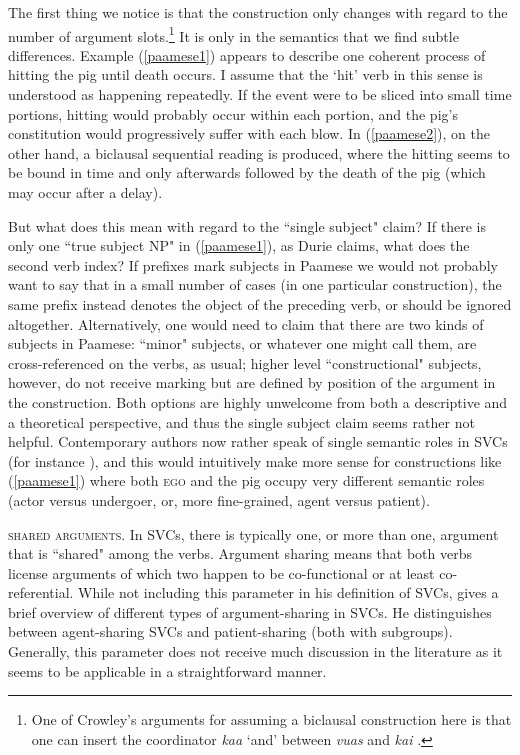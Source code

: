 The first thing we notice is that the construction only changes with regard to the number of argument slots.\footnote{One of Crowley's arguments for assuming a biclausal construction here is that one can insert the coordinator \textit{kaa} `and' between \textit{vuas} and \textit{kai} \citep[56]{crowley2002serial}.} It is only in the semantics that we find subtle differences. Example (\ref{paamese1}) appears to describe one coherent process of hitting the pig until death occurs. I assume that the `hit' verb in this sense is understood as happening repeatedly. If the event were to be sliced into small time portions, hitting would probably occur within each portion, and the pig's constitution would progressively suffer with each blow. In (\ref{paamese2}), on the other hand, a biclausal sequential reading is produced, where the hitting seems to be bound in time and only afterwards followed by the death of the pig (which may occur after a delay). 

But what does this mean with regard to the ``single subject" claim? If there is only one ``true subject NP" in (\ref{paamese1}), as Durie claims, what does the second verb index? If prefixes mark subjects in Paamese we would not probably want to say that in a small number of cases (in one particular construction), the same prefix instead denotes the object of the preceding verb, or should be ignored altogether. Alternatively, one would need to claim that there are two kinds of subjects in Paamese: ``minor" subjects, or whatever one might call them, are cross-referenced on the verbs, as usual; higher level ``constructional" subjects, however, do not receive marking but are defined by position of the argument in the construction. Both options are highly unwelcome from both a descriptive and a theoretical perspective, and thus the single subject claim seems rather not helpful. Contemporary authors now rather speak of single semantic roles in SVCs (for instance \citealt{haspelmath2016serial}), and this would intuitively make more sense for constructions like (\ref{paamese1}) where both \textsc{ego} and the pig occupy very different semantic roles (actor versus undergoer, or, more fine-grained, agent versus patient).

\textsc{shared arguments}. In SVCs, there is typically one, or more than one, argument that is ``shared" among the verbs. Argument sharing means that both verbs license arguments of which two happen to be co-functional or at least co-referential. While not including this parameter in his definition of SVCs, \citet{haspelmath2016serial} gives a brief overview of different types of argument-sharing in SVCs. He distinguishes between agent-sharing SVCs and patient-sharing (both with subgroups). Generally, this parameter does not receive much discussion in the literature as it seems to be applicable in a straightforward manner.

